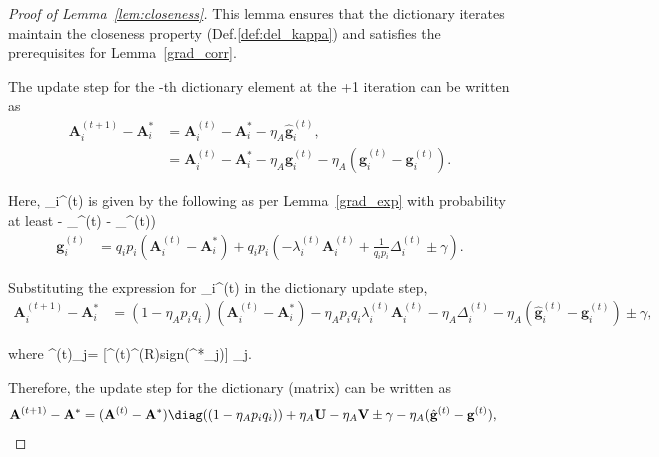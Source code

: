 \documentclass{article}
\newcommand{\sgn}{{\rm sign}}
\newcommand{\HT}{{\c{T}}}
\def\[#1\]{{$#1$}}
\def\b#1{{\mathbf{#1}}}
\def\c#1{{\mathcal{#1}}}
\begin{document}
	
\begin{proof}[Proof of Lemma~\ref{lem:closeness}]
	This lemma ensures that the dictionary iterates maintain the closeness property (Def.\ref{def:del_kappa}) and satisfies the prerequisites for Lemma~\ref{grad_corr}. 
	
	The update step for the \[i\]-th dictionary element at the \[s+1\] iteration can be written as
	\begin{align*}
	\b{A}_i^{(t+1)} - \b{A} _i^* &= \b{A}_i^{(t)} - \b{A}_i^* - \eta_A \hat{\b{g}}_i^{(t)},\\
	&=  \b{A}_i^{(t)} - \b{A}_i^*  - \eta_A \b{g}_i^{(t)} - \eta_A (\hat{\b{g}}_i^{(t)} - \b{g}_i^{(t)}).
	\end{align*}
	
	Here, \[\b{g}_i^{(t)}\] is given by the following as per Lemma~\ref{grad_exp} with probability at least \[(1 - \delta_{\HT}^{(t)} - \delta_{\beta}^{(t)})\]
	\begin{align*}
	\b{g}^{(t)}_i
	&= q_i p_i (\b{A}^{(t)}_i- \b{A}^*_i)  + q_i p_i(- \lambda^{(t)}_i\b{A}^{(t)}_i+ \tfrac{1}{q_i p_i}\Delta^{(t)}_i \pm \gamma).
	\end{align*}
	
	Substituting the expression for \[\b{g}_i^{(t)}\] in the dictionary update step,
	\begin{align*}
	\b{A}_i^{(t+1)} - \b{A} _i^* &= (1 - \eta_A p_i q_i) (\b{A}_i^{(t)} - \b{A}_i^*)  - \eta_A p_i q_i\lambda^{(t)}_i \b{A}^{(t)}_i 
	- \eta_A \Delta^{(t)}_i   - \eta_A (\hat{\b{g}}_i^{(t)} -  \b{g}_i^{(t)}) \pm \gamma,
	\end{align*}
	
	where \[\Delta^{(t)}_j= \b{E}[\b{A}^{(t)}\vartheta^{(R)}\sgn(\b{x}^*_j)] _j\].
	






	
	
	
	
	
	
	
	
	
	
	
	
	
	
	
	Therefore, the update step for the dictionary (matrix) can be written as
	\begin{align}\label{eq:closeness}
	\b{A}^{(t+1)} - \b{A}^* 
	&=  (\b{A}^{(t)} - \b{A}^*)\diag({(1 - \eta_A p_i q_i)})  + \eta_A \b{U}  - \eta_A \b{V} \pm \gamma - \eta_A (\hat{\b{g}}^{(t)} -  \b{g}^{(t)}),
	\end{align}
	

\end{proof}
\end{document}
